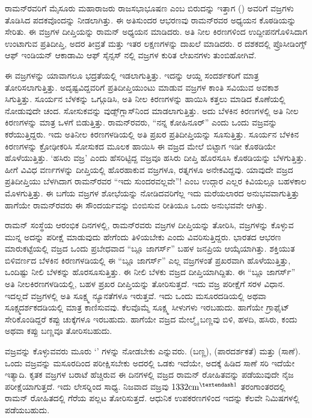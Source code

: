 ರಾಮನ್‍ರವರಿಗೆ ಮೈಸೂರು ಮಹಾರಾಜರು ರಾಜಸಭಾಭೂಷಣ ಎಂಬ ಬಿರುದನ್ನು ಇತ್ತಾಗ () ಅವರಿಗೆ  ವಜ್ರಗಳು ತೊಡಿಸಿದ ಪದಕವೊಂದನ್ನು ನೀಡಲಾಗಿತ್ತು. ಈ ಅತಿಸುಂದರ ಆಭರಣವು ರಾಮನ್‍ರವರ ಅಧ್ಯಯನ ಕೊಠಡಿಯನ್ನು ಸೇರಿತು. ಈ  ವಜ್ರಗಳ ದೀಪ್ತಿಯನ್ನು ರಾಮನ್ ಅಧ್ಯಯನ ಮಾಡಿದರು. ಅತಿ ನೀಲ ಕಿರಣಗಳಿಂದ ಉದ್ದೀಪನಗೊಳಿಸಿದಾಗ ಉಂಟಾಗುವ ಪ್ರತಿದೀಪ್ತಿ, ಅದರ ತೀವ್ರತೆ ಮತ್ತು ಇತರ ಲಕ್ಷಣಗಳನ್ನು ದಾಖಲೆ ಮಾಡಿದರು. ರ ದಶಕದಲ್ಲಿ ಪ್ರೊಸೀಡಿಂಗ್ಸ್ ಆಫ್ ಇಂಡಿಯನ್ ಆಕಾಡಾಮಿ ಆಫ್ ಸೈನ್ಸ‌ಸ್ \textit{}ನಲ್ಲಿ ವಜ್ರಗಳ ಕುರಿತ ಲೇಖನಗಳು ತುಂಬಿಹೋಗಿವೆ. 

ಈ ವಜ್ರಗಳನ್ನು ಯಾವಾಗಲೂ ಭದ್ರತೆಯಲ್ಲಿ ಇಡಲಾಗುತ್ತಿತ್ತು. ಇದನ್ನು ಆಯ್ದ ಸಂದರ್ಶಕರಿಗೆ ಮಾತ್ರ ತೋರಿಸಲಾಗುತ್ತಿತ್ತು. ಅದೃಷ್ಟವಿದ್ದವರಿಗೆ ಪ್ರತಿದೀಪ್ತಿಯುಂಟು ಮಾಡುವ ವಜ್ರಗಳ ಕಾಂತಿ ಸವಿಯುವ ಅವಕಾಶ ಸಿಗುತ್ತಿತ್ತು. ಸೂರ್ಯನ ಬೆಳಕನ್ನು ಒಗ್ಗೂಡಿಸಿ, ಅತಿ ನೀಲ ಕಿರಣಗಳನ್ನು ಹಾಯಿಸಿ ಕತ್ತಲು ಮಾಡಿದ ಕೊಣೆಯಲ್ಲಿ ನೋಡುವುದೇ ಚಂದ. ಸೋಸುಕವನ್ನು ವುಡ್ಸ್‌ಗ್ಲಾಸ್‍ನಿಂದ ಮಾಡಲಾಗುತ್ತಿತ್ತು. ಅದು ಬೆಳಕಿನ ಕಿರಣಗಳಲ್ಲಿ ಅತಿ ನೀಲ ಕಿರಣಗಳನ್ನು ಮಾತ್ರ ಒಳಗೆ ಬಿಡುತ್ತಿತ್ತು. ರಾಮನ್‍ರವರು, “ನನ್ನ ಕೋಹಿನೂರ್” ಎಂದು ಒಂದು ವಜ್ರವನ್ನು ಕರೆಯುತ್ತಿದ್ದರು. ಇದು ಅತಿನೀಲ ಕಿರಣಗಳಡಿಯಲ್ಲಿ ಅತಿ ಪ್ರಖರ ಪ್ರತಿದೀಪ್ತಿಯನ್ನು ಸೂಸುತ್ತಿತ್ತು. ಸೂರ್ಯನ ಬೆಳಕಿನ ಕಿರಣಗಳನ್ನು ಕ್ರೋಢೀಕರಿಸಿ ಸೋಸುಕದ ಮೂಲಕ ಹಾಯಿಸಿ ಈ ವಜ್ರದ ಮೇಲೆ ಬಿಟ್ಟಾಗ ಇಡೀ ಕೊಠಡಿಯೇ ಹೊಳೆಯುತ್ತಿತ್ತು. ‘ಹಸಿರು ವಜ್ರ’ ಎಂದು ಹೆಸರಿಟ್ಟಿದ್ದ ವಜ್ರವೂ ಹಸಿರು ದೀಪ್ತಿ ಹೊರಸೂಸಿ ಕೊಠಡಿಯನ್ನು ಬೆಳಗುತ್ತಿತ್ತು. ಹೀಗೆ ವಿವಿಧ ವರ್ಣಗಳನ್ನು ದೀಪ್ತಿಯಲ್ಲಿ ಹೊರಹಾಕುವ ವಜ್ರಗಳೂ, ರತ್ನಗಳೂ ಅನೇಕವಿದ್ದವು. ಯಾವುದೇ ವಜ್ರದ ಪ್ರತಿದೀಪ್ತಿಯು ಬೆಳಗಿದಾಗ ರಾಮನ್‍ರವರ “ಇದು ಸುಂದರವಲ್ಲವೇ”! ಎಂಬ ಉದ್ಗಾರ ಎಲ್ಲರ ಕಿವಿಯಲ್ಲೂ ಬಹಳಕಾಲ ಮೊಳಗುತ್ತಿತ್ತು. ಈ ಬಗೆಯ ವಜ್ರಗಳ ಶೋಭೆಯನ್ನು ನೋಡಿದವರಿಗೆಲ್ಲ ಇದು ಮರೆಯಲಾರದ ಅನುಭವವಾಗುತ್ತಿತ್ತು ಹಾಗೆಯೇ ರಾಮನ್‍ರವರು ಈ ಸೌಂದರ್ಯವನ್ನು ಬಿಂಬಿಸುವ ರೀತಿಯೂ ಒಂದು ಅನುಭವವೇ ಆಗಿತ್ತು.

ರಾಮನ್ ಸಂಸ್ಥೆಯ ಆರಂಭಿಕ ದಿನಗಳಲ್ಲಿ, ರಾಮನ್‍ರವರು ವಜ್ರಗಳ ದೀಪ್ತಿಯನ್ನು ತೋರಿಸಿ, ವಜ್ರಗಳನ್ನು ಕೊಳ್ಳುವ ಮುನ್ನ ಅದನ್ನು ಪರೀಕ್ಷೆ ಮಾಡುವುದು ಹೇಗೆಂದು ತಿಳಿಯಬೇಕು ಎಂದು ವಿವರಿಸುತ್ತಿದ್ದರು. ಭಾರತದ ಆಭರಣ ಮಾರುಕಟ್ಟೆಯಲ್ಲಿ ವಜ್ರದ ಒಂದು ಪ್ರಬೇಧವಾದ “ಬ್ಲೂ ಜಾಗರ್ಸ್” ಬಹಳ ಜನಪ್ರಿಯ ಆಯ್ಕೆಯಾಗಿತ್ತು. ಶಕ್ತಿಯುತ ಬಿಳಿವರ್ಣದ ಬೆಳಕಿನ ಕಿರಣಗಳಡಿಯಲ್ಲಿ ಈ “ಬ್ಲೂ ಜಾಗರ್ಸ್” ಎಲ್ಲ ವಜ್ರಗಳಂತೆ ಪ್ರಖರವಾಗಿ ಹೊಳೆಯುತ್ತಿತ್ತು, ಒಂದಿಷ್ಟು ನೀಲಿ ಬೆಳಕನ್ನು ಹೊರಸೂಸುತ್ತಿತ್ತು. ಈ ನೀಲಿ ಬೆಳಕು ವಜ್ರದ ದೀಪ್ತಿಯಾಗಿದ್ದಿತು. ಈ “ಬ್ಲೂ ಜಾಗರ್ಸ್” ಅತಿ ನೀಲಕಿರಣಗಳಡಿಯಲ್ಲಿ, ಬಹಳ ಪ್ರಖರ ದೀಪ್ತಿಯನ್ನು ತೋರಿಸುತ್ತದೆ. ಇದು ವಜ್ರ ಪರೀಕ್ಷೆಗೆ ಸರಳ ವಿಧಾನ. ಇದಲ್ಲದೆ ವಜ್ರಗಳಲ್ಲಿ ಅತಿ ಸೂಕ್ಷ್ಮ ನ್ಯೂನತೆಗಳೂ ಇರುತ್ತವೆ. ಇದು ಒಂದು ಮಸೂರದಡಿಯಲ್ಲಿ ಅಥವಾ ಸೂಕ್ಷ್ಮದರ್ಶಕದಡಿಯಲ್ಲಿ ಮಾತ್ರ ಕಾಣಿಸುವವು. ಕೆಲವೊಮ್ಮೆ ಸೂಕ್ಷ್ಮ ಸೀಳುಗಳು ಇರಬಹುದು. ಹಾಗೆಯೇ ಗ್ರಾಫೈಟ್ ಸೇರಿಕೊಂಡಿದ್ದರೆ ಕಪ್ಪು ಚುಕ್ಕೆಗಳೂ ಇರಬಹುದು. ಹಾಗೆಯೇ ವಜ್ರದ ಮೇಲ್ಮೈ ಬಣ್ಣವು ಬಿಳಿ, ಹಳದಿ, ಹಸಿರು, ಕಂದು ಅಥವಾ ಕಪ್ಪು ಬಣ್ಣವೂ ತೋರಿಸಬಹುದು.

ವಜ್ರವನ್ನು ಕೊಳ್ಳುವವರು ಮೂರು ‘’ ಗಳನ್ನು ನೋಡಬೇಕು ಎನ್ನುವರು.  (ಬಣ್ಣ),  (ಪಾರದರ್ಶಕತೆ) ಮತ್ತು  (ಸಾಣೆ). ಒಂದು ವಜ್ರವನ್ನು  ಮಸೂರದಿಂದ ಪರೀಕ್ಷಿಸಬೇಕು ಅದರಲ್ಲಿ ಒಡಕು ಇದೆಯೇ, ಅದಕ್ಕೆ ಹಿಡಿದ ಸಾಣೆ ಸರಿ ಇದೆಯೇ ಇತ್ಯಾದಿ. ಕೃತಕ ವಜ್ರಗಳ ಬರಾಟೆ ಹೆಚ್ಚಿರುವ ಈ ದಿನಗಳಲ್ಲಿ ವಜ್ರದ ರಾಮನ್ ರೋಹಿತವನ್ನು ಪಡೆಯುವುದೇ ನೈಜ ಪರೀಕ್ಷೆಯಾಗುತ್ತದೆ. ಇದು ಲೇಸರ್‍ನಿಂದ ಸಾಧ್ಯ. ನಿಜವಾದ ವಜ್ರವು $1332 \general{{\rm cm}}^\general{{–1}}$ ತರಂಗಾಂತರದಲ್ಲಿ ರಾಮನ್ ರೋಹಿತದಲ್ಲಿ ಗೆರೆಯ ಪಲ್ಲಟ ತೋರಿಸುತ್ತದೆ. ಆಧುನಿಕ ಉಪಕರಣಗಳಿಂದ ಇದನ್ನು ಕೆಲವೇ ನಿಮಿಷಗಳಲ್ಲಿ ಪಡೆಯಬಹುದು.

